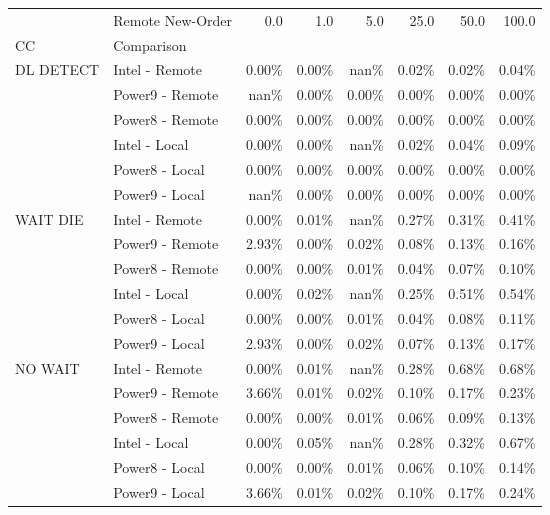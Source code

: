 \begin{tabular}{llrrrrrr}
\toprule
       & Remote New-Order &  0.0   &  1.0   &  5.0   &  25.0  &  50.0  &  100.0 \\
CC & Comparison &        &        &        &        &        &        \\
\midrule
DL DETECT & Intel - Remote &  0.00\% &  0.00\% &   nan\% &  0.02\% &  0.02\% &  0.04\% \\
       & Power9 - Remote &   nan\% &  0.00\% &  0.00\% &  0.00\% &  0.00\% &  0.00\% \\
       & Power8 - Remote &  0.00\% &  0.00\% &  0.00\% &  0.00\% &  0.00\% &  0.00\% \\
       & Intel - Local &  0.00\% &  0.00\% &   nan\% &  0.02\% &  0.04\% &  0.09\% \\
       & Power8 - Local &  0.00\% &  0.00\% &  0.00\% &  0.00\% &  0.00\% &  0.00\% \\
       & Power9 - Local &   nan\% &  0.00\% &  0.00\% &  0.00\% &  0.00\% &  0.00\% \\
WAIT DIE & Intel - Remote &  0.00\% &  0.01\% &   nan\% &  0.27\% &  0.31\% &  0.41\% \\
       & Power9 - Remote &  2.93\% &  0.00\% &  0.02\% &  0.08\% &  0.13\% &  0.16\% \\
       & Power8 - Remote &  0.00\% &  0.00\% &  0.01\% &  0.04\% &  0.07\% &  0.10\% \\
       & Intel - Local &  0.00\% &  0.02\% &   nan\% &  0.25\% &  0.51\% &  0.54\% \\
       & Power8 - Local &  0.00\% &  0.00\% &  0.01\% &  0.04\% &  0.08\% &  0.11\% \\
       & Power9 - Local &  2.93\% &  0.00\% &  0.02\% &  0.07\% &  0.13\% &  0.17\% \\
NO WAIT & Intel - Remote &  0.00\% &  0.01\% &   nan\% &  0.28\% &  0.68\% &  0.68\% \\
       & Power9 - Remote &  3.66\% &  0.01\% &  0.02\% &  0.10\% &  0.17\% &  0.23\% \\
       & Power8 - Remote &  0.00\% &  0.00\% &  0.01\% &  0.06\% &  0.09\% &  0.13\% \\
       & Intel - Local &  0.00\% &  0.05\% &   nan\% &  0.28\% &  0.32\% &  0.67\% \\
       & Power8 - Local &  0.00\% &  0.00\% &  0.01\% &  0.06\% &  0.10\% &  0.14\% \\
       & Power9 - Local &  3.66\% &  0.01\% &  0.02\% &  0.10\% &  0.17\% &  0.24\% \\

\end{tabular}
